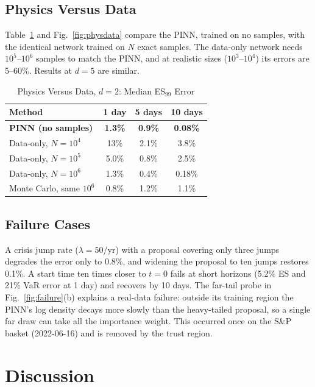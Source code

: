 \documentclass[conference]{IEEEtran}
\begin{document}
\subsection{Physics Versus Data}
Table~\ref{tab:physdata} and Fig.~\ref{fig:physdata} compare the PINN, trained on no samples, with the identical
network trained on $N$ exact samples. The data-only network needs $10^5$--$10^6$ samples to match the PINN, and at
realistic sizes ($10^3$--$10^4$) its errors are 5--60\%. Results at $d = 5$ are similar.

\begin{table}[!t]
  \caption{Physics Versus Data, $d = 2$: Median ES$_{99}$ Error}
  \label{tab:physdata}
  \centering
  \begin{tabular}{lccc}
    \toprule
    Method & 1 day & 5 days & 10 days \\
    \midrule
    \textbf{PINN (no samples)} & \textbf{1.3\%} & \textbf{0.9\%} & \textbf{0.08\%} \\
    Data-only, $N = 10^4$ & 13\%  & 2.1\% & 3.8\% \\
    Data-only, $N = 10^5$ & 5.0\% & 0.8\% & 2.5\% \\
    Data-only, $N = 10^6$ & 1.3\% & 0.4\% & 0.18\% \\
    Monte Carlo, same $10^6$ & 0.8\% & 1.2\% & 1.1\% \\
    \bottomrule
  \end{tabular}
\end{table}

\subsection{Failure Cases}
A crisis jump rate ($\lambda = 50$/yr) with a proposal covering only three jumps degrades the error only to 0.8\%,
and widening the proposal to ten jumps restores 0.1\%. A start time ten times closer to $t = 0$ fails at short
horizons (5.2\% ES and 21\% VaR error at 1 day) and recovers by 10 days. The far-tail probe in
Fig.~\ref{fig:failure}(b) explains a real-data failure: outside its training region the PINN's log density decays
more slowly than the heavy-tailed proposal, so a single far draw can take all the importance weight. This occurred
once on the S\&P basket (2022-06-16) and is removed by the trust region.

\section{Discussion}
\end{document}
